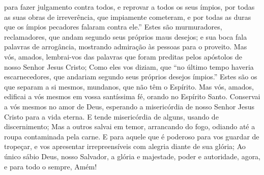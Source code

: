 {para fazer julgamento contra todos, e reprovar a todos os seus ímpios, por todas as suas obras de irreverência, que impiamente cometeram, e por todas as duras
{} que os ímpios pecadores falaram contra ele.”
Estes são murmuradores, reclamadores, que andam segundo seus próprios maus desejos; e sua boca fala palavras de arrogância, mostrando admiração às pessoas para o
{} proveito.
Mas vós, amados, lembrai-vos das palavras que foram preditas pelos apóstolos de nosso Senhor Jesus Cristo;
Como eles vos diziam, que “no último tempo haveria escarnecedores, que andariam segundo seus próprios desejos ímpios.”
Estes são os que separam a si mesmos, mundanos, que não têm o Espírito.
Mas vós, amados, edificai a vós mesmos em vossa santíssima fé, orando no Espírito Santo.
Conservai a vós mesmos no amor de Deus, esperando a misericórdia de nosso Senhor Jesus Cristo para a vida eterna.
E tende misericórdia de alguns, usando de discernimento;
Mas a outros salvai em temor, arrancando
{} do fogo, odiando até a roupa contaminada pela carne.
E para aquele que é poderoso para vos guardar de tropeçar, e vos apresentar irrepreensíveis com alegria diante de sua glória;
Ao único sábio Deus, nosso Salvador,{} a glória e majestade, poder e autoridade, agora, e para todo o sempre, Amém!\par }